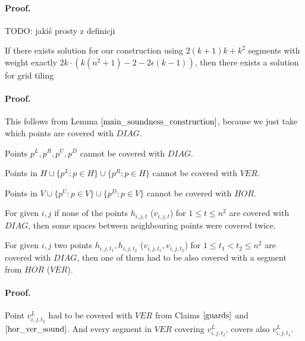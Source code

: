 \paragraph{Proof.}
TODO: jakiś prosty z definicji

\begin{lemma}
	If there exists solution for our construction
	using $2(k+1)k + k^2$ segments
	with weight exactly $2k \cdot (k(n^2+1) - 2 - 2\epsilon(k-1))$,
	then there exists a solution for grid tiling
\end{lemma}

\paragraph{Proof.}
This follows from Lemma $\ref{main_soundness_construction}$,
because we just take which points are covered with $DIAG$.

\begin{claim}
\label{guards}
Points $p^{L}, p^R, p^U, p^D$ cannot be covered with $DIAG$.
\end{claim}

\begin{claim}
\label{hor_ver_sound}
Points in $H \cup \{p^L : p \in H\} \cup \{p^R : p \in H\}$
cannot be covered with $VER$.

Points in $V \cup \{p^U : p \in V\} \cup \{p^D : p \in V\} $
cannot be covered with $HOR$.
\end{claim}

\begin{claim}
For given $i, j$ if none of the points $h_{i, j, t}$ ($v_{i, j, t}$)
for $1 \le t \le n^2$ are covered with $DIAG$,
then some spaces between neighbouring points were covered twice.
\end{claim}

\begin{claim}
For given $i, j$ two points $h_{i, j, t_1}, h_{i, j, t_2}$
($v_{i, j, t_1}, v_{i, j, t_2}$)
for $1 \le t_1 < t_2 \le n^2$ are covered with $DIAG$,
then one of them had to be also covered with a segment from $HOR$
($VER$).
\end{claim}
\paragraph{Proof.}
Point $v^L_{i, j, t_2}$ had to be covered with $VER$
from Claims $\ref{guards}$ and $\ref{hor_ver_sound}$.
And every segment in $VER$ covering $v^L_{i, j, t_2}$,
covers also $v^L_{i, j, t_1}$.


